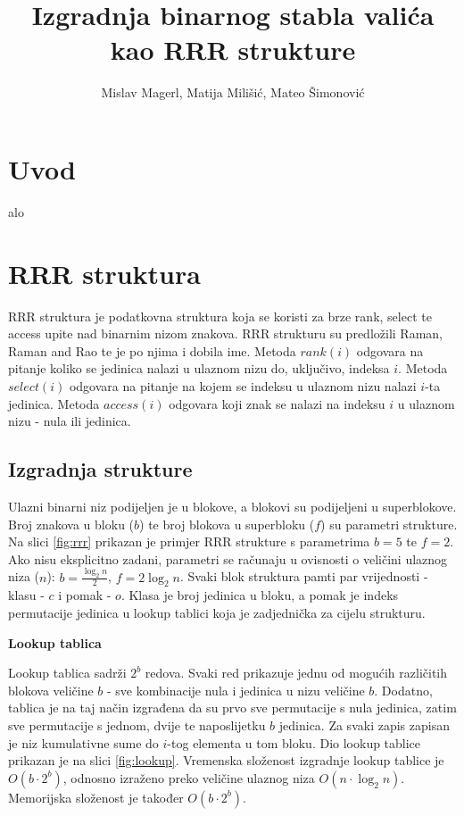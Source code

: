 \documentclass[times, utf8, seminar, numeric]{fer}
\begin{document}
\title{Izgradnja binarnog stabla valića kao RRR strukture}
\author{Mislav Magerl, Matija Milišić, Mateo Šimonović}

\maketitle

\tableofcontents

\chapter{Uvod}
alo

\chapter{RRR struktura}
\label{sec:rrr}
RRR struktura je podatkovna struktura koja se koristi za brze rank, select te access upite nad binarnim nizom znakova. RRR strukturu su predložili Raman, Raman and Rao \citep{DBLP:journals/corr/abs-0705-0552} te je po njima i dobila ime. Metoda $rank(i)$ odgovara na pitanje koliko se jedinica nalazi u ulaznom nizu do, uključivo, indeksa $i$. Metoda $select(i)$ odgovara na pitanje na kojem se indeksu u ulaznom nizu nalazi $i$-ta jedinica. Metoda $access(i)$ odgovara koji znak se nalazi na indeksu $i$ u ulaznom nizu - nula ili jedinica.

\section{Izgradnja strukture}
\label{sec:izgradnja-rrr}
Ulazni binarni niz podijeljen je u blokove, a blokovi su podijeljeni u superblokove. Broj znakova u bloku ($b$) te broj blokova u superbloku ($f$) su parametri strukture. Na slici \ref{fig:rrr} prikazan je primjer RRR strukture s parametrima $b=5$ te $f=2$. Ako nisu eksplicitno zadani, parametri se računaju u ovisnosti o veličini ulaznog niza ($n$):
$b=\frac{\log_2n}{2}$,
$f=2  \log_2n$.
Svaki blok struktura pamti par vrijednosti - klasu  - $c$ i pomak  - $o$. Klasa je broj jedinica u bloku, a pomak je indeks permutacije jedinica u lookup tablici koja je zadjednička za cijelu strukturu. 

\textbf{Lookup tablica}

Lookup tablica sadrži $2^b$ redova. Svaki red prikazuje jednu od mogućih različitih blokova veličine $b$ - sve kombinacije nula i jedinica u nizu veličine $b$. Dodatno, tablica je na taj način izgrađena da su prvo sve permutacije s nula jedinica, zatim sve permutacije s jednom, dvije te naposlijetku $b$ jedinica. Za svaki zapis zapisan je niz kumulativne sume do $i$-tog elementa u tom bloku. Dio lookup tablice prikazan je na slici \ref{fig:lookup}. Vremenska složenost izgradnje lookup tablice je $O(b \cdot 2^b)$, odnosno izraženo preko veličine ulaznog niza $O(n \cdot \log_2n)$. Memorijska složenost je također $O(b \cdot 2^b)$.
\end{document}
